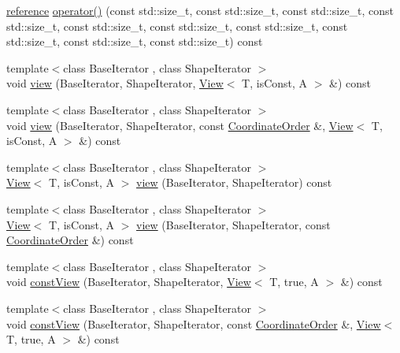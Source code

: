 \begin{DoxyCompactItemize}
\item 
\hyperlink{classandres_1_1View_aebdd1f19272b743b4422ff8ba18fc11a}{reference} \hyperlink{classandres_1_1View_aba55b68ecfb877185851b4fa985dfafe}{operator()} (const std\+::size\+\_\+t, const std\+::size\+\_\+t, const std\+::size\+\_\+t, const std\+::size\+\_\+t, const std\+::size\+\_\+t, const std\+::size\+\_\+t, const std\+::size\+\_\+t, const std\+::size\+\_\+t, const std\+::size\+\_\+t, const std\+::size\+\_\+t) const
\item 
{\footnotesize template$<$class Base\+Iterator , class Shape\+Iterator $>$ }\\void \hyperlink{classandres_1_1View_a7c7ea156cd617f1b0791a96892036247}{view} (Base\+Iterator, Shape\+Iterator, \hyperlink{classandres_1_1View}{View}$<$ T, is\+Const, A $>$ \&) const
\item 
{\footnotesize template$<$class Base\+Iterator , class Shape\+Iterator $>$ }\\void \hyperlink{classandres_1_1View_aac6e790581f866188f867df56e553fb3}{view} (Base\+Iterator, Shape\+Iterator, const \hyperlink{namespaceandres_a2ac8b7aa89d44e8188a7c0ba50f4306b}{Coordinate\+Order} \&, \hyperlink{classandres_1_1View}{View}$<$ T, is\+Const, A $>$ \&) const
\item 
{\footnotesize template$<$class Base\+Iterator , class Shape\+Iterator $>$ }\\\hyperlink{classandres_1_1View}{View}$<$ T, is\+Const, A $>$ \hyperlink{classandres_1_1View_a005b38aafae0e4779c70d86c584df3e0}{view} (Base\+Iterator, Shape\+Iterator) const
\item 
{\footnotesize template$<$class Base\+Iterator , class Shape\+Iterator $>$ }\\\hyperlink{classandres_1_1View}{View}$<$ T, is\+Const, A $>$ \hyperlink{classandres_1_1View_a028f12953e1ee1f5b173e85030f88367}{view} (Base\+Iterator, Shape\+Iterator, const \hyperlink{namespaceandres_a2ac8b7aa89d44e8188a7c0ba50f4306b}{Coordinate\+Order} \&) const
\item 
{\footnotesize template$<$class Base\+Iterator , class Shape\+Iterator $>$ }\\void \hyperlink{classandres_1_1View_acb0d57d73402cffe1377969e249d4fe8}{const\+View} (Base\+Iterator, Shape\+Iterator, \hyperlink{classandres_1_1View}{View}$<$ T, true, A $>$ \&) const
\item 
{\footnotesize template$<$class Base\+Iterator , class Shape\+Iterator $>$ }\\void \hyperlink{classandres_1_1View_aee1078f78e787f1c637d1a2dfe9a1246}{const\+View} (Base\+Iterator, Shape\+Iterator, const \hyperlink{namespaceandres_a2ac8b7aa89d44e8188a7c0ba50f4306b}{Coordinate\+Order} \&, \hyperlink{classandres_1_1View}{View}$<$ T, true, A $>$ \&) const

\end{DoxyCompactItemize}
